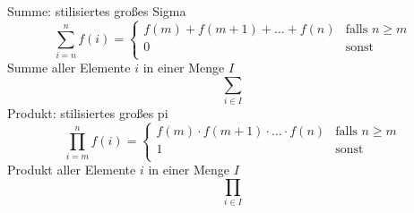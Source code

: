 Summe: stilisiertes großes Sigma
\[\sum\limits_{i = n}^n f(i) = \left \lbrace \begin{array}{ll}
                                                 f(m) + f(m + 1) + \dots + f(n) & \textrm{falls } n \geq m \\
                                                 0                              & \textrm{sonst}           \\
\end{array} \right.\]
Summe aller Elemente $i$ in einer Menge $I$
\[\sum\limits_{i \in I}\]
Produkt: stilisiertes großes pi
\[\prod\limits_{i=m}^{n} f(i) = \left \lbrace \begin{array}{ll}
                                                  f(m) \cdot f(m + 1) \cdot \dots \cdot f(n) & \textrm{falls } n \geq m \\
                                                  1                                          & \textrm{sonst}           \\
\end{array} \right.\]
Produkt aller Elemente $i$ in einer Menge $I$
\[\prod\limits_{i \in I}\]

